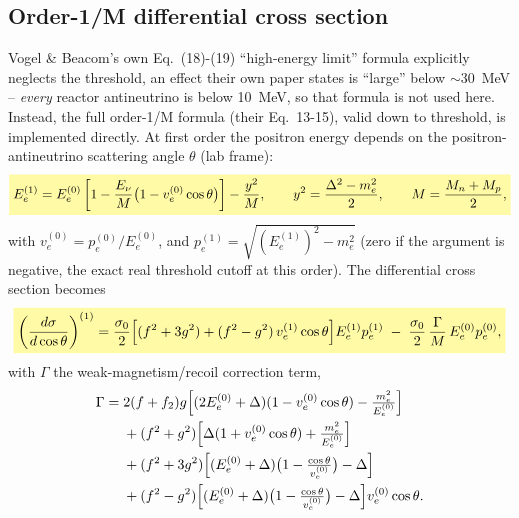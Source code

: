 \begin{theorybox}
\subsection*{Order-1/M differential cross section}
Vogel \& Beacom's own Eq.~(18)-(19) ``high-energy limit'' formula
explicitly neglects the threshold, an effect their own paper states is
``large'' below $\sim30$~MeV -- \emph{every} reactor antineutrino is below
10~MeV, so that formula is not used here. Instead, the full order-1/M
formula (their Eq.~13-15), valid down to threshold, is implemented
directly. At first order the positron energy depends on the
positron-antineutrino scattering angle $\theta$ (lab frame):
\begin{equation}
  \keyresult{E_e^{(1)} = E_e^{(0)}\left[1-\frac{E_\nu}{M}\bigl(1-v_e^{(0)}\cos\theta\bigr)\right]
    - \frac{y^2}{M},\qquad y^2=\frac{\Delta^2-m_e^2}{2},\qquad M=\frac{M_n+M_p}{2},}
  \label{eq:ibd-positron-energy-firstorder}
\end{equation}
with $v_e^{(0)}=p_e^{(0)}/E_e^{(0)}$, and $p_e^{(1)}=\sqrt{(E_e^{(1)})^2-m_e^2}$
(zero if the argument is negative, the exact real threshold cutoff at this
order). The differential cross section becomes
\begin{equation}
  \keyresult{\left(\frac{d\sigma}{d\cos\theta}\right)^{(1)} =
    \frac{\sigma_0}{2}\Bigl[(f^2+3g^2)+(f^2-g^2)\,v_e^{(1)}\cos\theta\Bigr]E_e^{(1)}p_e^{(1)}
    \;-\;\frac{\sigma_0}{2}\,\frac{\Gamma}{M}\,E_e^{(0)}p_e^{(0)},}
  \label{eq:ibd-firstorder-diffxs}
\end{equation}
with $\Gamma$ the weak-magnetism/recoil correction term,
\begin{align}
  \Gamma ={}& 2(f+f_2)g\Bigl[(2E_e^{(0)}+\Delta)(1-v_e^{(0)}\cos\theta)-\tfrac{m_e^2}{E_e^{(0)}}\Bigr] \nonumber\\
  &+ (f^2+g^2)\Bigl[\Delta(1+v_e^{(0)}\cos\theta)+\tfrac{m_e^2}{E_e^{(0)}}\Bigr] \nonumber\\
  &+ (f^2+3g^2)\Bigl[(E_e^{(0)}+\Delta)\bigl(1-\tfrac{\cos\theta}{v_e^{(0)}}\bigr)-\Delta\Bigr] \nonumber\\
  &+ (f^2-g^2)\Bigl[(E_e^{(0)}+\Delta)\bigl(1-\tfrac{\cos\theta}{v_e^{(0)}}\bigr)-\Delta\Bigr]v_e^{(0)}\cos\theta.
  \label{eq:ibd-gamma}
\end{align}


\end{theorybox}
